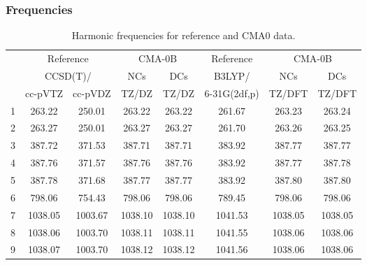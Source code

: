\documentclass[10pt,oneside]{article}
\begin{document}
\subsubsection*{Frequencies}
\begin{table}[h!]
\centering
\caption{Harmonic frequencies for reference and CMA0 data.}
\begin{tabular}{cccccccc}
\toprule
{} & \multicolumn{2}{c}{Reference} & \multicolumn{2}{c}{CMA-0B} &    Reference & \multicolumn{2}{c}{CMA-0B} \\
{} & \multicolumn{2}{c}{CCSD(T)/} &     NCs &     DCs &       B3LYP/ &     NCs &     DCs \\
{} &   cc-pVTZ & cc-pVDZ &   TZ/DZ &   TZ/DZ & 6-31G(2df,p) &  TZ/DFT &  TZ/DFT \\
\midrule
1 &    263.22 &  250.01 &  263.22 &  263.22 &       261.67 &  263.23 &  263.24 \\
2 &    263.27 &  250.01 &  263.27 &  263.27 &       261.70 &  263.26 &  263.25 \\
3 &    387.72 &  371.53 &  387.71 &  387.71 &       383.92 &  387.77 &  387.77 \\
4 &    387.76 &  371.57 &  387.76 &  387.76 &       383.92 &  387.77 &  387.78 \\
5 &    387.78 &  371.68 &  387.77 &  387.77 &       383.92 &  387.80 &  387.80 \\
6 &    798.06 &  754.43 &  798.06 &  798.06 &       789.45 &  798.06 &  798.06 \\
7 &   1038.05 & 1003.67 & 1038.10 & 1038.10 &      1041.53 & 1038.05 & 1038.05 \\
8 &   1038.06 & 1003.70 & 1038.11 & 1038.11 &      1041.55 & 1038.06 & 1038.06 \\
9 &   1038.07 & 1003.70 & 1038.12 & 1038.12 &      1041.56 & 1038.06 & 1038.06 \\
\bottomrule
\end{tabular}
\end{table}

\clearpage
\end{document}
